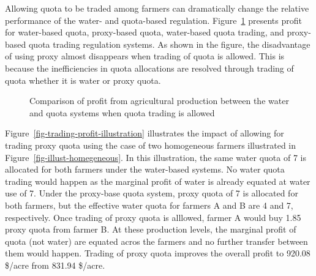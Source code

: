 \documentclass[
  letterpaper,
  DIV=11,
  numbers=noendperiod]{scrartcl}
\begin{document}
Allowing quota to be traded among farmers can dramatically change the
relative performance of the water- and quota-based regulation.
Figure~\ref{fig-trading-profit} presents profit for water-based quota,
proxy-based quota, water-based quota trading, and proxy-based quota
trading regulation systems. As shown in the figure, the disadvantage of
using proxy almost disappears when trading of quota is allowed. This is
because the inefficiencies in quota allocations are resolved through
trading of quota whether it is water or proxy quota.

\begin{figure}[H]


\caption{\label{fig-trading-profit}Comparison of profit from
agricultural production between the water and quota systems when quota
trading is allowed}

\end{figure}%

Figure~\ref{fig-trading-profit-illustration} illustrates the impact of
allowing for trading proxy quota using the case of two homogeneous
farmers illustrated in Figure~\ref{fig-illust-homegeneous}. In this
illustration, the same water quota of 7 is allocated for both farmers
under the water-based systems. No water quota trading would happen as
the marginal profit of water is already equated at water use of 7. Under
the proxy-base quota system, proxy quota of 7 is allocated for both
farmers, but the effective water quota for farmers A and B are 4 and 7,
respectively. Once trading of proxy quota is alllowed, farmer A would
buy 1.85 proxy quota from farmer B. At these production levels, the
marginal profit of quota (not water) are equated acros the farmers and
no further transfer between them would happen. Trading of proxy quota
improves the overall profit to 920.08 \$/acre from 831.94 \$/acre.
\end{document}
